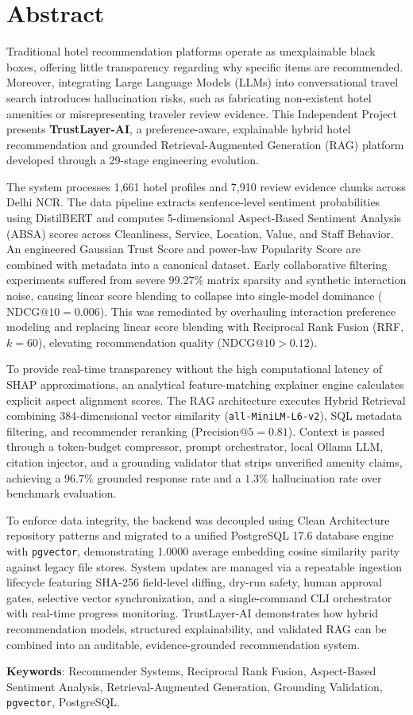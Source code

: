 \chapter*{\centering Abstract}

Traditional hotel recommendation platforms operate as unexplainable black boxes, offering little transparency regarding why specific items are recommended. Moreover, integrating Large Language Models (LLMs) into conversational travel search introduces hallucination risks, such as fabricating non-existent hotel amenities or misrepresenting traveler review evidence. This Independent Project presents \textbf{TrustLayer-AI}, a preference-aware, explainable hybrid hotel recommendation and grounded Retrieval-Augmented Generation (RAG) platform developed through a 29-stage engineering evolution.

The system processes 1,661 hotel profiles and 7,910 review evidence chunks across Delhi NCR. The data pipeline extracts sentence-level sentiment probabilities using DistilBERT and computes 5-dimensional Aspect-Based Sentiment Analysis (ABSA) scores across Cleanliness, Service, Location, Value, and Staff Behavior. An engineered Gaussian Trust Score and power-law Popularity Score are combined with metadata into a canonical dataset. Early collaborative filtering experiments suffered from severe 99.27\% matrix sparsity and synthetic interaction noise, causing linear score blending to collapse into single-model dominance ($\text{NDCG}@10 = 0.006$). This was remediated by overhauling interaction preference modeling and replacing linear score blending with Reciprocal Rank Fusion (RRF, $k=60$), elevating recommendation quality ($\text{NDCG}@10 > 0.12$).

To provide real-time transparency without the high computational latency of SHAP approximations, an analytical feature-matching explainer engine calculates explicit aspect alignment scores. The RAG architecture executes Hybrid Retrieval combining 384-dimensional vector similarity (\texttt{all-MiniLM-L6-v2}), SQL metadata filtering, and recommender reranking ($\text{Precision}@5 = 0.81$). Context is passed through a token-budget compressor, prompt orchestrator, local Ollama LLM, citation injector, and a grounding validator that strips unverified amenity claims, achieving a $96.7\%$ grounded response rate and a $1.3\%$ hallucination rate over benchmark evaluation.

To enforce data integrity, the backend was decoupled using Clean Architecture repository patterns and migrated to a unified PostgreSQL 17.6 database engine with \texttt{pgvector}, demonstrating 1.0000 average embedding cosine similarity parity against legacy file stores. System updates are managed via a repeatable ingestion lifecycle featuring SHA-256 field-level diffing, dry-run safety, human approval gates, selective vector synchronization, and a single-command CLI orchestrator with real-time progress monitoring. TrustLayer-AI demonstrates how hybrid recommendation models, structured explainability, and validated RAG can be combined into an auditable, evidence-grounded recommendation system.

\vspace{0.4in}
\noindent \textbf{Keywords}: Recommender Systems, Reciprocal Rank Fusion, Aspect-Based Sentiment Analysis, Retrieval-Augmented Generation, Grounding Validation, \texttt{pgvector}, PostgreSQL.
